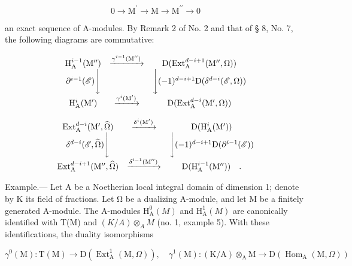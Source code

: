 \[
0 \rightarrow \mathrm{M} ^ {\prime} \rightarrow \mathrm{M} \rightarrow \mathrm{M} ^ {\prime \prime} \rightarrow 0\tag{ℰ}
\]

an exact sequence of A-modules. By Remark 2 of No. 2 and that of § 8, No. 7, the following diagrams are commutative:

\[
\begin{array}{c c c} \mathrm{H} _ {\mathrm{A}} ^ {i - 1} (\mathrm{M} ^ {\prime \prime}) & \xrightarrow {\gamma^ {i - 1} (\mathrm{M} ^ {\prime \prime})} & \mathrm{D} (\mathrm{Ext} _ {\mathrm{A}} ^ {d - i + 1} (\mathrm{M} ^ {\prime \prime}, \Omega)) \\ \partial^ {i - 1} (\mathscr {E}) \Bigg \downarrow & & \Bigg \downarrow (- 1) ^ {d - i + 1} \mathrm{D} (\delta^ {d - i} (\mathscr {E}, \Omega)) \\ \mathrm{H} _ {\mathrm{A}} ^ {i} (\mathrm{M} ^ {\prime}) & \xrightarrow {\gamma^ {i} (\mathrm{M} ^ {\prime})} & \mathrm{D} (\mathrm{Ext} _ {\mathrm{A}} ^ {d - i} (\mathrm{M} ^ {\prime}, \Omega)) \end{array}
\]

\[
\begin{array}{c c c} \operatorname{Ext} _ {\mathrm{A}} ^ {d - i} (\mathrm{M} ^ {\prime}, \widehat {\Omega}) & \xrightarrow {\delta^ {i} (\mathrm{M} ^ {\prime})} & \mathrm{D} (\mathrm{H} _ {\mathrm{A}} ^ {i} (\mathrm{M} ^ {\prime})) \\ \delta^ {d - i} (\mathscr {E}, \widehat {\Omega}) \Bigg \downarrow & & \Bigg \downarrow (- 1) ^ {d - i + 1} \mathrm{D} (\partial^ {i - 1} (\mathscr {E})) \\ \operatorname{Ext} _ {\mathrm{A}} ^ {d - i + 1} (\mathrm{M} ^ {\prime \prime}, \widehat {\Omega}) & \xrightarrow {\delta^ {i - 1} (\mathrm{M} ^ {\prime \prime})} & \mathrm{D} (\mathrm{H} _ {\mathrm{A}} ^ {i - 1} (\mathrm{M} ^ {\prime \prime})) \quad . \end{array}
\]

Example.--- Let A be a Noetherian local integral domain of dimension 1; denote by K its field of fractions. Let Ω be a dualizing A-module, and let M be a finitely generated A-module. The A-modules \(\mathrm{H}_{\mathrm{A}}^{0}(M)\) and \(\mathrm{H}_{\mathrm{A}}^{1}(M)\) are canonically identified with T(M) and \((K/A) \otimes_{A} M\) (no. 1, example 5). With these identifications, the duality isomorphisms

\[
\gamma^ {0} (\mathrm{M}): \mathrm{T} (\mathrm{M}) \longrightarrow \mathrm{D} \left(\operatorname{Ext} _ {\mathrm{A}} ^ {1} (\mathrm{M}, \Omega)\right), \quad \gamma^ {1} (\mathrm{M}): (\mathrm{K} / \mathrm{A}) \otimes_ {\mathrm{A}} \mathrm{M} \longrightarrow \mathrm{D} \left(\operatorname{Hom} _ {\mathrm{A}} (\mathrm{M}, \Omega)\right)
\]

